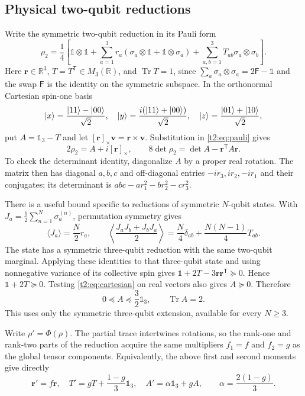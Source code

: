 \documentclass[11pt,a4paper]{article}
\newcommand{\Tr}{\operatorname{Tr}}
\newcommand{\id}{\mathds{1}}
\begin{document}
\subsection{Physical two-qubit reductions}
Write the symmetric two-qubit reduction in its Pauli form
\begin{equation}\label{t2:eq:pauli}
 \rho_2=\frac14\left[\id\otimes\id+
 \sum_{a=1}^3r_a(\sigma_a\otimes\id+\id\otimes\sigma_a)
 +\sum_{a,b=1}^3T_{ab}\sigma_a\otimes\sigma_b\right].
\end{equation}
Here $\mathbf r\in\mathbb R^3$, $T=T^{\mathsf T}\in M_3(\mathbb R)$,
and $\Tr T=1$, since $\sum_a\sigma_a\otimes\sigma_a=2\mathsf F-\id$
and the swap $\mathsf F$ is the identity on the symmetric subspace.
In the orthonormal Cartesian spin-one basis
\[
 \ket{x}=\frac{\ket{11}-\ket{00}}{\sqrt2},\quad
 \ket{y}=\frac{i(\ket{11}+\ket{00})}{\sqrt2},\quad
 \ket{z}=\frac{\ket{01}+\ket{10}}{\sqrt2},
\]
put $A=\id_3-T$ and let $[\mathbf r]_\times\mathbf v=
\mathbf r\times\mathbf v$. Substitution in \eqref{t2:eq:pauli} gives
\begin{equation}\label{t2:eq:cartesian}
 2\rho_2=A+i[\mathbf r]_\times,\qquad
 8\det\rho_2=\det A-\mathbf r^{\mathsf T}A\mathbf r.
\end{equation}
To check the determinant identity, diagonalize $A$ by a proper real
rotation. The matrix then has diagonal $a,b,c$ and off-diagonal entries
$-ir_3,ir_2,-ir_1$ and their conjugates; its determinant is
$abc-ar_1^2-br_2^2-cr_3^2$.

There is a useful bound specific to reductions of symmetric $N$-qubit
states. With $J_a=\frac12\sum_{n=1}^N\sigma_a^{(n)}$, permutation
symmetry gives
\[
 \langle J_a\rangle=\frac N2r_a,\qquad
 \left\langle\frac{J_aJ_b+J_bJ_a}{2}\right\rangle
 =\frac N4\delta_{ab}+\frac{N(N-1)}4T_{ab}.
\]
The state has a symmetric three-qubit reduction with the same two-qubit
marginal. Applying these identities to that three-qubit state and using
nonnegative variance of its collective spin gives
$\id+2T-3\mathbf r\mathbf r^{\mathsf T}\succeq0$.
Hence $\id+2T\succeq0$. Testing \eqref{t2:eq:cartesian} on real
vectors also gives $A\succeq0$. Therefore
\begin{equation}\label{t2:eq:A-bounds}
 0\preceq A\preceq\frac32\id_3,\qquad\Tr A=2.
\end{equation}
This uses only the symmetric three-qubit extension, available for every
$N\ge3$.

Write $\rho'=\Phi(\rho)$. The partial trace intertwines rotations,
so the rank-one and rank-two parts of the reduction acquire the same
multipliers $f_1=f$ and $f_2=g$ as the global tensor components.
Equivalently, the above first and second moments give directly
\begin{equation}\label{t2:eq:transform}
 \mathbf r'=f\mathbf r,\quad T'=gT+\frac{1-g}{3}\id_3,
 \quad A'=\alpha\id_3+gA,\qquad\alpha=\frac{2(1-g)}3.
\end{equation}
\end{document}
